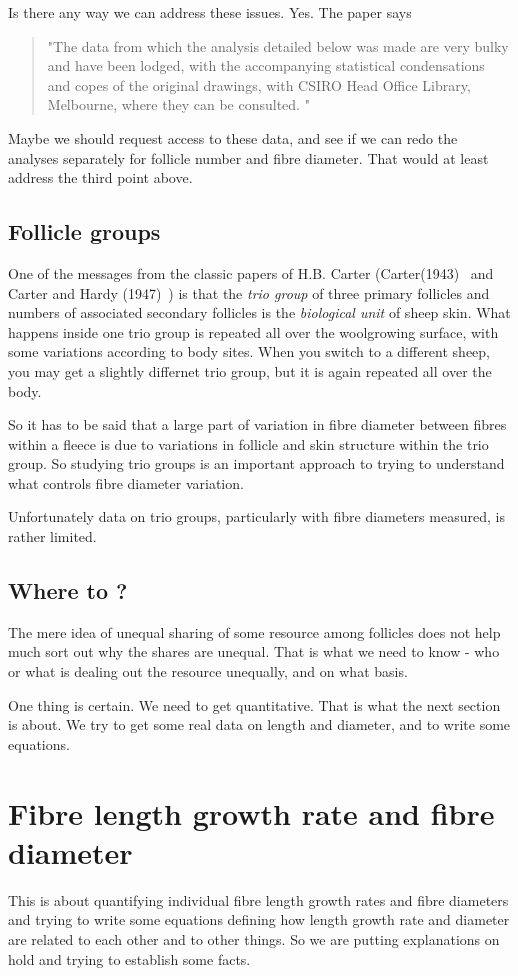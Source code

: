 \documentclass[titlepage]{article}  %
\begin{document}
Is there any way we can address these issues. Yes. The paper says
\begin{quote}
"The data from which the analysis detailed below was made are very bulky and have been lodged, with the accompanying statistical condensations and copes of the original drawings, with CSIRO Head Office Library, Melbourne, where they can be consulted. "
\end{quote}
Maybe we should request access to these data, and see if we can redo the analyses separately for follicle number and fibre diameter. That would at least address the third point above.

\subsection{Follicle groups}
One of the messages from the classic papers of H.B. Carter (Carter(1943)~\cite{cart:43} and Carter and Hardy (1947)~\cite{cart:47}) is that the {\em trio group} of three primary follicles and numbers of associated secondary follicles is the {\em biological unit} of sheep skin. What happens inside one trio group is repeated all over the woolgrowing surface, with some variations according to body sites. When you switch to  a different sheep, you may get a slightly differnet trio group, but it is again repeated all over the body.

So it has to be said that a large part of variation in fibre diameter between fibres within a fleece is due to variations in follicle and skin structure within the trio group. So studying trio groups is an important approach to trying to understand what controls fibre diameter variation. 

Unfortunately data on trio groups, particularly with fibre diameters measured, is rather limited. 

\subsection{Where to ?}
The mere idea of unequal sharing of some resource among follicles does not help much sort out why the shares are unequal. That is what we need to know - who or what is dealing out the resource unequally, and on what basis.

One thing is certain. We need to get quantitative.  That is what the next section is about. We try to get some real data on length and diameter, and to write some equations.

\section{Fibre length growth rate and fibre diameter}
This is about quantifying individual fibre length growth rates and fibre diameters and trying to write some equations defining how length growth rate and diameter are related to each other and to other things. So we are putting explanations on hold and trying to establish some facts.
\end{document}
